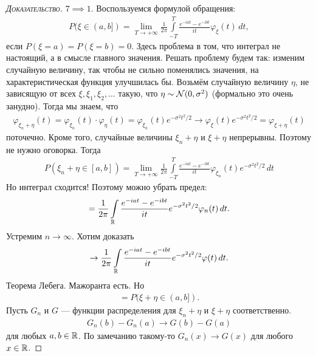 \documentclass[../main.tex]{subfiles}
\begin{document}
\begin{proof}[\normalfont\textsc{Доказательство}]
 $ 7 \implies 1 $. Воспользуемся формулой обращения:
 \begin{align*}
  P(\xi \in (a,b]) = \lim_{T \to +\infty}  \frac{1}{2\pi} \int\limits_{-T}^{T} \frac{e^{-iat} - e^{-ibt}}{it} \varphi_\xi(t)\,dt,
 \end{align*} если $ P(\xi = a) = P(\xi = b) = 0 $. Здесь проблема в том, что интеграл не настоящий, а в смысле главного значения. Решать проблему будем так: изменим случайную величину, так чтобы не сильно поменялись значения, на характеристическая функция улучшилась бы. Возьмём случайную величину $ \eta $, не зависящую от всех $ \xi, \xi_1, \xi_2, \ldots $ такую, что $ \eta \sim \mathcal N(0, \sigma^{2}) $ (формально это очень занудно). Тогда мы знаем, что
 \begin{align*}
  \varphi_{\xi_n + \eta}(t) = \varphi_{\xi_n}(t) \cdot \varphi_\eta(t) = \varphi_{\xi_n}(t) e^{-\sigma^{2}t^{2} / 2} \to \varphi_\xi(t) e^{-\sigma^{2}t^{2} / 2} = \varphi_{\xi+\eta}(t)
 \end{align*} поточечно. Кроме того, случайные величины $ \xi_n + \eta $ и   $ \xi + \eta $ непрерывны. Поэтому не нужно оговорка. Тогда
   \begin{align*}
    P(\xi_n + \eta \in [a,b]) = \lim_{T \to +\infty}  \frac{1}{2\pi} \int\limits_{-T}^T \frac{e^{-iat} - e^{-ibt}}{it} \varphi_{\xi_n}(t) e^{-\sigma^{2}t^{2} / 2} \,dt
 \end{align*} Но интеграл сходится! Поэтому можно убрать предел:
 \begin{align*}
  = \frac{1}{2\pi} \int\limits_{\mathbb{R}} \frac{e^{-iat} - e^{-ibt}}{it} e^{-\sigma^{2}t^{2} / 2}\varphi_n(t)\,dt.
 \end{align*} Устремим $ n \to \infty $. Хотим доказать
 \begin{align*}
   \to \frac{1}{2\pi} \int\limits_{\mathbb{R}} \frac{e^{-iat}-e^{-ibt}}{it}  e^{-\sigma^{2}t^{2} / 2}\varphi(t)\,dt.
 \end{align*} Теорема Лебега. Мажоранта есть. Но
 \begin{align*}
  = P(\xi+ \eta \in (a,b]).
 \end{align*} Пусть $ G_n $ и $ G $ --- функции распределения для $ \xi_n + \eta $ и $ \xi + \eta $ соответственно.
 \begin{align*}
  G_n(b) - G_n(a) \to G(b) - G(a)
 \end{align*} для любых $ a,b\in\mathbb{R} $. По замечанию такому-то $ G_n(x) \to G(x) $ для любого $ x \in \mathbb{R} $.


\end{proof}
\end{document}

